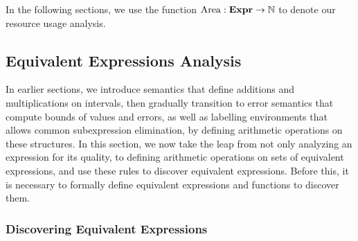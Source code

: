 In the following sections, we use the function $\operatorname{\mathrm{Area}}: \mathbf{Expr}\to\mathbb{N}$
to denote our resource usage analysis.

\subsection{Equivalent Expressions Analysis}
\label{sub:equivalent_expressions_analysis}

In earlier sections, we introduce semantics that define additions and
multiplications on intervals, then gradually transition to error semantics that
compute bounds of values and errors, as well as labelling environments that
allows common subexpression elimination, by defining arithmetic operations on
these structures. In this section, we now take the leap from not only analyzing
an expression for its quality, to defining arithmetic operations on sets of
equivalent expressions, and use these rules to discover equivalent expressions.
Before this, it is necessary to formally define equivalent expressions and
functions to discover them.

\subsubsection{Discovering Equivalent Expressions}

